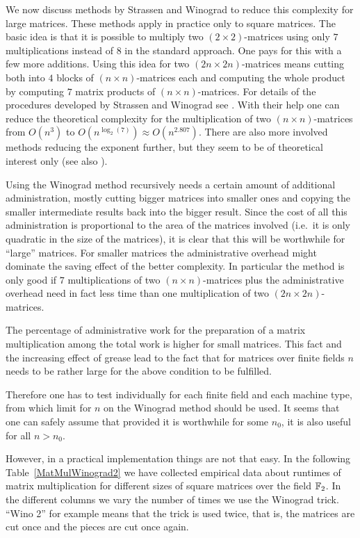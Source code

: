 We now discuss methods by Strassen and Winograd to reduce this complexity
%
for large matrices. These methods apply in practice only to square matrices.
The basic idea is that it is possible to multiply two $(2 \times 2)$-matrices
using only $7$ multiplications instead of $8$ in the standard approach.
One pays for this with a few more additions. Using this idea for two 
$(2n \times 2n)$-matrices means cutting both into $4$ blocks of 
$(n\times n)$-matrices each and computing the whole product by computing
$7$ matrix products of $(n \times n)$-matrices. For details of the
procedures developed by Strassen and Winograd see \cite[4.6.4]{AOCP2}.
%
With their help one can reduce the theoretical complexity for the 
multiplication of two $(n \times n)$-matrices from $O(n^3)$
to $O(n^{\log_2(7)}) \approx O(n^{2.807})$. 
There are also more involved methods reducing the exponent
further, but they seem to be of theoretical interest only (see 
also \cite[4.6.4]{AOCP2}).

Using the Winograd method recursively needs a certain amount of
%
additional administration, mostly cutting bigger matrices into smaller
ones and copying the smaller intermediate results back into the
bigger result. Since the cost of all this administration is proportional
to the area of the matrices involved (i.e.~it is only quadratic in the
size of the matrices), it is clear that this will be worthwhile for 
``large'' matrices. For smaller matrices the administrative overhead
might dominate the saving effect of the better complexity.
In particular the method is only good if $7$ multiplications of two $(n
\times n)$-matrices plus the administrative overhead need in fact less
time than one multiplication of two $(2n \times 2n)$-matrices.

The percentage of administrative work for the preparation of a matrix
multiplication among the total work is higher for small matrices.
This fact and the increasing effect of grease lead to the
fact that for matrices over finite fields $n$ needs to be rather large
for the above condition to be fulfilled. 

Therefore one has to test individually for each finite field and each
machine type, from which limit for $n$ on the Winograd method should
be used. It seems that one can safely assume that provided it is 
worthwhile for some $n_0$, it is also useful for all $n > n_0$. 

However, in a practical implementation things are not that easy. In
the following Table~\ref{MatMulWinograd2} we have collected empirical
data about runtimes of matrix multiplication for different sizes of
square matrices over the field $\mathbb{F}_2$. In the different columns we vary
the number of times we use the Winograd trick. ``Wino 2'' for example
means that the trick is used twice, that is, the matrices are cut once
and the pieces are cut once again.

